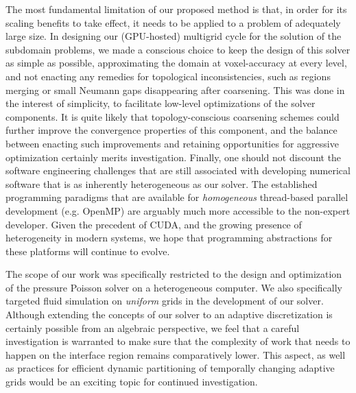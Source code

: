 The most fundamental limitation of our proposed method is that, in order for its scaling benefits to take effect, it needs to be applied to a problem of adequately
large size. In designing our (GPU-hosted) multigrid cycle for the
solution of the subdomain problems, we made a conscious choice to keep the design of this solver as simple as possible, approximating the domain at voxel-accuracy at
every level, and not enacting any remedies for topological inconsistencies, such as regions merging or small Neumann gaps disappearing after coarsening. This was
done in the interest of simplicity, to facilitate low-level optimizations of the solver components. It is quite likely that topology-conscious coarsening schemes
\cite{Westermann:2014:LiquidAdaptiveHexahedral} could further improve the convergence properties of this component, and the balance between enacting such
improvements and retaining opportunities for aggressive optimization certainly merits investigation. Finally, one should not discount the software engineering
challenges that are still associated with developing numerical software that is as inherently heterogeneous as our solver. The established programming
paradigms that are available for \emph{homogeneous} thread-based parallel development (e.g. OpenMP) are arguably much more accessible to the non-expert
developer. Given the precedent of CUDA, and the growing presence of heterogeneity in modern systems, we hope that programming abstractions for these platforms
will continue to evolve. 

The scope of our work was specifically restricted to the design and optimization of the pressure Poisson solver on a heterogeneous computer. We also specifically targeted fluid
simulation on \emph{uniform} grids in the development of our solver. Although extending the concepts of our solver to an adaptive discretization is certainly possible from an
algebraic perspective, we feel that a careful investigation is warranted to make sure that 
the complexity of work that needs to happen on the interface region remains comparatively lower. This aspect, as well as practices for efficient dynamic partitioning
of temporally changing adaptive grids would be an exciting topic for continued investigation. 

